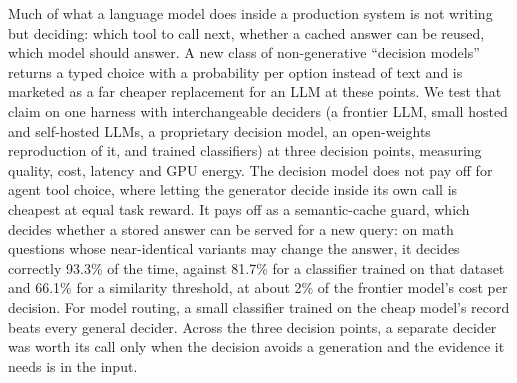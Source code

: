 Much of what a language model does inside a production system is not writing but deciding: which tool to call next, whether a cached answer can be reused, which model should answer.
A new class of non-generative ``decision models'' returns a typed choice with a probability per option instead of text and is marketed as a far cheaper replacement for an LLM at these points.
We test that claim on one harness with interchangeable deciders (a frontier LLM, small hosted and self-hosted LLMs, a proprietary decision model, an open-weights reproduction of it, and trained classifiers) at three decision points, measuring quality, cost, latency and GPU energy.
The decision model does not pay off for agent tool choice, where letting the generator decide inside its own call is cheapest at equal task reward.
It pays off as a semantic-cache guard, which decides whether a stored answer can be served for a new query: on math questions whose near-identical variants may change the answer, it decides correctly 93.3\% of the time, against 81.7\% for a classifier trained on that dataset and 66.1\% for a similarity threshold, at about 2\% of the frontier model's cost per decision.
For model routing, a small classifier trained on the cheap model's record beats every general decider.
Across the three decision points, a separate decider was worth its call only when the decision avoids a generation and the evidence it needs is in the input.
